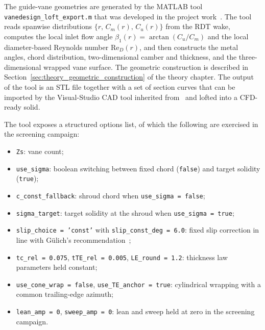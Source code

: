 The guide-vane geometries are generated by the MATLAB tool \texttt{vanedesign\_loft\_export.m} that was developed in the project work~\cite{Leonsen2025}. The tool reads spanwise distributions $\{r,\,C_m(r),\,C_u(r)\}$ from the RDT wake, computes the local inlet flow angle $\beta_1(r) = \arctan(C_u/C_m)$ and the local diameter-based Reynolds number $\mathrm{Re}_D(r)$, and then constructs the metal angles, chord distribution, two-dimensional camber and thickness, and the three-dimensional wrapped vane surface. The geometric construction is described in Section~\ref{sec:theory_geometric_construction} of the theory chapter. The output of the tool is an STL file together with a set of section curves that can be imported by the Visual-Studio CAD tool inherited from~\cite{Verdijck2025} and lofted into a CFD-ready solid.
 
The tool exposes a structured options list, of which the following are exercised in the screening campaign:
\begin{itemize}
  \item \texttt{Zs}: vane count;
  \item \texttt{use\_sigma}: boolean switching between fixed chord (\texttt{false}) and target solidity (\texttt{true});
  \item \texttt{c\_const\_fallback}: shroud chord when \texttt{use\_sigma = false};
  \item \texttt{sigma\_target}: target solidity at the shroud when \texttt{use\_sigma = true};
  \item \texttt{slip\_choice = 'const'} with \texttt{slip\_const\_deg = 6.0}: fixed slip correction in line with G\"ulich's recommendation~\cite{Gulich2010};
  \item \texttt{tc\_rel = 0.075}, \texttt{tTE\_rel = 0.005}, \texttt{LE\_round = 1.2}: thickness law parameters held constant;
  \item \texttt{use\_cone\_wrap = false}, \texttt{use\_TE\_anchor = true}: cylindrical wrapping with a common trailing-edge azimuth;
  \item \texttt{lean\_amp = 0}, \texttt{sweep\_amp = 0}: lean and sweep held at zero in the screening campaign.
\end{itemize}
 
